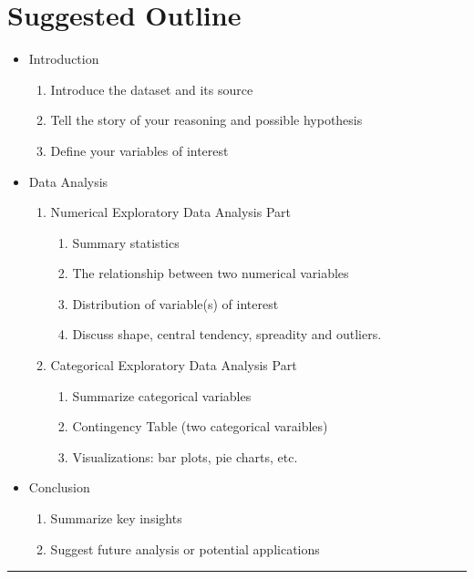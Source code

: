 \documentclass[11pt]{article}
\begin{document}
\section*{Suggested Outline}
\begin{itemize}
    \item Introduction
    \begin{enumerate}
        \item Introduce the dataset and its source
        \item Tell the story of your reasoning and possible hypothesis
        \item Define your variables of interest
    \end{enumerate}
    \item Data Analysis
    \begin{enumerate}
        \item Numerical Exploratory Data Analysis Part
        \begin{enumerate}
            \item Summary statistics 
            \item The relationship between two numerical variables 
            \item Distribution of variable(s) of interest
            \item Discuss shape, central tendency, spreadity and outliers. 
        \end{enumerate}
        \item Categorical Exploratory Data Analysis Part
        \begin{enumerate}
            \item Summarize categorical variables
            \item Contingency Table (two categorical varaibles)
            \item Visualizations: bar plots, pie charts, etc.
        \end{enumerate} 
    \end{enumerate}
    \item Conclusion
        \begin{enumerate}
            \item Summarize key insights
            \item Suggest future analysis or potential applications
        \end{enumerate} 
\end{itemize}
\begin{center}\rule{16cm}{1pt}\end{center}
\end{document}
